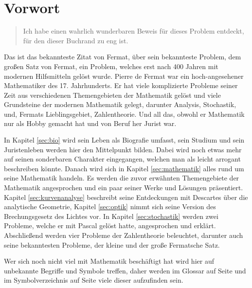 \section{Vorwort}

\begin{quote}
	Ich habe einen wahrlich wunderbaren Beweis für dieses Problem entdeckt, für den
	dieser Buchrand zu eng ist.
\end{quote}

Das ist das bekannteste Zitat von Fermat, über sein bekannteste Problem, dem großen
Satz von Fermat, ein Problem, welches erst nach 400 Jahren mit modernen Hilfsmitteln
gelöst wurde. Pierre de Fermat war ein hoch-angesehener Mathematiker des 17.
Jahrhunderts. Er hat viele komplizierte Probleme seiner Zeit aus verschiedenen
Themengebieten der Mathematik gelöst und viele Grundsteine der modernen Mathematik
gelegt, darunter Analysis, Stochastik, und, Fermats Lieblingsgebiet, Zahlentheorie.
Und all das, obwohl er Mathematik nur als Hobby gemacht hat und von Beruf her Jurist
war.

In Kapitel \ref{sec:bio} wird sein Leben als Biografie umfasst, sein Studium und sein
Juristenleben werden hier den Mittelpunkt bilden. Dabei wird noch etwas mehr auf
seinen sonderbaren Charakter eingegangen, welchen man als leicht arrogant beschreiben
könnte. Danach wird sich in Kapitel \ref{sec:mathematik} alles rund um seine
Mathematik handeln. Es werden die zuvor erwähnten Themengebiete der Mathematik
angesprochen und ein paar seiner Werke und Lösungen präsentiert. Kapitel
\ref{sec:kurvenanalyse} beschreibt seine Entdeckungen mit Descartes über die
analytische Geometrie, Kapitel \ref{sec:optik} nimmt sich seine Version des
Brechungsgesetz des Lichtes vor. In Kapitel \ref{sec:stochastik} werden zwei Probleme,
welche er mit Pascal gelöst hatte, angesprochen und erklärt. Abschließend werden
vier Probleme der Zahlentheorie beleuchtet, darunter auch seine bekanntesten Probleme,
der kleine und der große Fermatsche Satz.

Wer sich noch nicht viel mit Mathematik beschäftigt hat wird hier auf unbekannte
Begriffe und Symbole treffen, daher werden im Glossar auf Seite \pageref{sec:glossary}
und im Symbolverzeichnis auf Seite \pageref{sec:symb} viele dieser aufzufinden sein.
